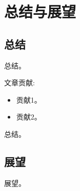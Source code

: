 \chapter{总结与展望}

\section{总结}

总结。

文章贡献:

\begin{itemize}
    \item 贡献1。

    \item 贡献2。

\end{itemize}

总结。
  
\section{展望}

展望。





